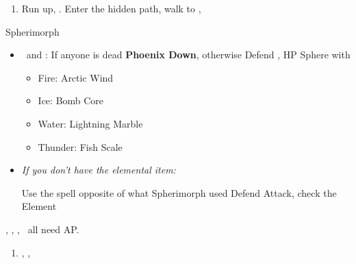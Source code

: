 \begin{enumerate}[resume]
	\item Run up, \sd. Enter the hidden path, walk to \auron, \sd
\end{enumerate}
\bothvfill\winvfill\lossvfill
\begin{battle}[12000]{Spherimorph}
	\begin{itemize}
		\tidusf Change Weapon to Sonic Steel
		\tidusf Defend
		\switch{\tidus}{\rikku}
		\rikkuf Grenade, check the Element
		\item \kimahri\ and \yuna: If anyone is dead \textbf{Phoenix Down}, otherwise Defend
		\rikkuf \od, HP Sphere with
		\begin{itemize}
			\item Fire: Arctic Wind
			\item Ice: Bomb Core
			\item Water: Lightning Marble
			\item Thunder: Fish Scale
		\end{itemize}
		\item \textit{If you don't have the elemental item:}
			\begin{itemize}
				\switch{\rikku}{\lulu}
				\luluf Use the spell opposite of what Spherimorph used
				\yunaf Defend
				\kimahrif Attack, check the Element
				\switch{\lulu}{\rikku}
				\rikkuf \od
			\end{itemize}
	\end{itemize}
	\tidus, \yuna, \kimahri, \rikku\ all need AP.
\end{battle}
\begin{enumerate}[resume]
	\item \cs[1:50], \sd, \sd
\end{enumerate}
\colend
